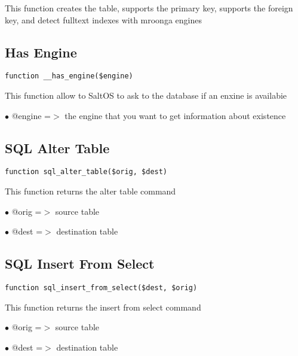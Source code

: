 \documentclass[a4paper]{book}
\begin{document}
This function creates the table, supports the primary key, supports the
foreign key, and detect fulltext indexes with mroonga engines

\hypertarget{toc256}{}
\subsection{Has Engine}

\begin{lstlisting}
function __has_engine($engine)
\end{lstlisting}

This function allow to SaltOS to ask to the database if an enxine is
availabie

\begin{compactitem}
\item[\color{myblue}$\bullet$] @engine =$>$ the engine that you want to get information about existence
\end{compactitem}

\hypertarget{toc257}{}
\subsection{SQL Alter Table}

\begin{lstlisting}
function sql_alter_table($orig, $dest)
\end{lstlisting}

This function returns the alter table command

\begin{compactitem}
\item[\color{myblue}$\bullet$] @orig =$>$ source table
\item[\color{myblue}$\bullet$] @dest =$>$ destination table
\end{compactitem}

\hypertarget{toc258}{}
\subsection{SQL Insert From Select}

\begin{lstlisting}
function sql_insert_from_select($dest, $orig)
\end{lstlisting}

This function returns the insert from select command

\begin{compactitem}
\item[\color{myblue}$\bullet$] @orig =$>$ source table
\item[\color{myblue}$\bullet$] @dest =$>$ destination table
\end{compactitem}
\end{document}
